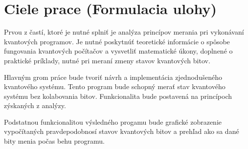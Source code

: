 
\chapter{Ciele prace (Formulacia ulohy)}

Prvou z častí, ktoré je nutné splniť je analýza princípov merania pri 
vykonávaní kvantových programov. Je nutné poskytnúť teoretické informácie
o spôsobe fungovania kvantových počítačov a vysvetliť matematické úkony,
doplnené o praktické príklady, nutné pri meraní zmeny stavov kvantových 
bitov.

Hlavným grom práce bude tvoriť návrh a implementácia zjednodušeného 
kvantového systému. Tento program bude schopný merať stav kvantového systému 
bez kolabovania bitov. Funkcionalita bude postavená na princípoch zýskaných
z analýzy.

Podstatnou funkcionalitou výsledného progamu bude grafické zobrazenie 
vypočítaných pravdepodobnosí stavov kvantových bitov a prehľad ako sa dané
bity menia počas behu programu.


